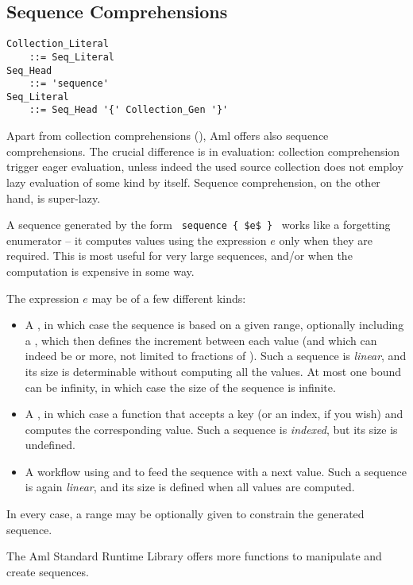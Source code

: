 \subsection{Sequence Comprehensions}
\label{sec:sequence-comprehensions}

\grammar\begin{lstlisting}
Collection_Literal 
    ::= Seq_Literal
Seq_Head 
    ::= 'sequence'
Seq_Literal
    ::= Seq_Head '{' Collection_Gen '}'
\end{lstlisting}

Apart from collection comprehensions (), Aml offers also sequence comprehensions. The crucial difference is in evaluation: collection comprehension trigger eager evaluation, unless indeed the used source collection does not employ lazy evaluation of some kind by itself. Sequence comprehension, on the other hand, is super-lazy. 

A sequence generated by the form ~\lstinline!sequence { $e$ }!~ works like a forgetting enumerator -- it computes values using the expression $e$ only when they are required. This is most useful for very large sequences, and/or when the computation is expensive in some way. 

The expression $e$ may be of a few different kinds:
\begin{itemize}
  \item A , in which case the sequence is based on a given range, optionally including a , which then defines the increment between each value (and which can indeed be  or more, not limited to fractions of ). Such a sequence is {\em linear}, and its size is determinable without computing all the values. At most one bound can be infinity, in which case the size of the sequence is infinite. 
  \item A , in which case a function that accepts a key (or an index, if you wish) and computes the corresponding value. Such a sequence is {\em indexed}, but its size is undefined. 
  \item A workflow using  and  to feed the sequence with a next value. Such a sequence is again {\em linear}, and its size is defined when all values are computed. 
\end{itemize}

In every case, a range may be optionally given to constrain the generated sequence. 

The Aml Standard Runtime Library offers more functions to manipulate and create sequences. 






